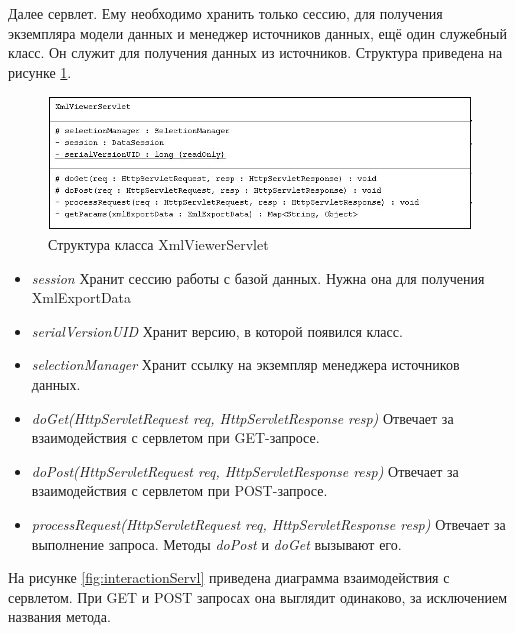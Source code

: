 \documentclass[a4paper,12pt]{diplom}
\begin{document}
Далее сервлет. Ему необходимо хранить только сессию, для получения экземпляра модели данных и менеджер источников данных, ещё один служебный класс. Он служит для получения данных из источников. Структура приведена на рисунке \ref{fig:servletStruct}.

\begin{figure}[h!]
	\centering
	\includegraphics[width=\textwidth]{imgs/XmlViewerServlet.png.jpg}
	\caption{Структура класса XmlViewerServlet}
	\label{fig:servletStruct}
\end{figure}

\begin{itemize}
    \item \textit{session} Хранит сессию работы с базой данных. Нужна она для получения XmlExportData
    \item \textit{serialVersionUID} Хранит версию, в которой появился класс.
    \item \textit{selectionManager} Хранит ссылку на экземпляр менеджера источников данных.
    \item \textit{doGet(HttpServletRequest req, HttpServletResponse resp)} Отвечает за взаимодействия с сервлетом при GET-запросе.
    \item \textit{doPost(HttpServletRequest req, HttpServletResponse resp)} Отвечает за взаимодействия с сервлетом при POST-запросе.
    \item \textit{processRequest(HttpServletRequest req, HttpServletResponse resp)} Отвечает за выполнение запроса. Методы \textit{doPost} и \textit{doGet} вызывают его.
\end{itemize} 

На рисунке \ref{fig:interactionServl} приведена диаграмма взаимодействия с сервлетом. При GET и POST запросах она выглядит одинаково, за исключением названия метода.
\end{document}
